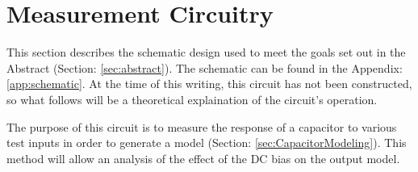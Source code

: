 \section {Measurement Circuitry}
\label{sec:measCirc}
This section describes the schematic design used to meet the goals set out in the Abstract (Section: \ref{sec:abstract}). The schematic can be found in the Appendix: \ref{app:schematic}. At the time of this writing, this circuit has not been constructed, so what follows will be a theoretical explaination of the circuit's operation.

The purpose of this circuit is to measure the response of a capacitor to various test inputs in order to generate a model (Section: \ref{sec:CapacitorModeling}). This method will allow an analysis of the effect of the DC bias on the output model.

\nocite{my_ieeePaper}












